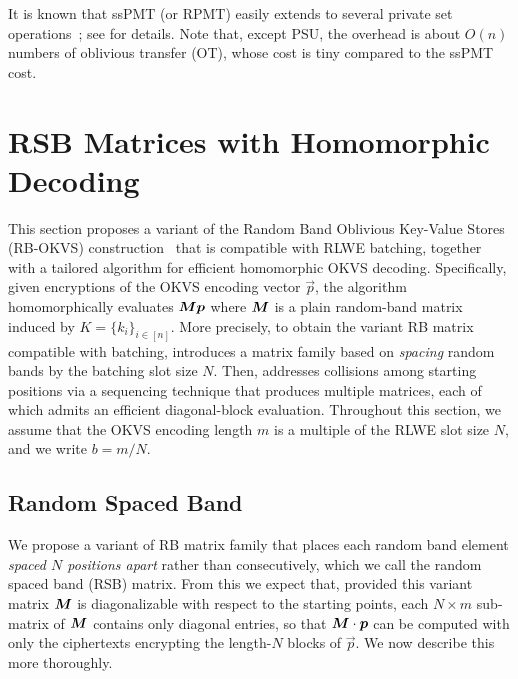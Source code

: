 It is known that ssPMT (or RPMT) easily extends to several private set operations~\cite{PSTY19,CGS22,CZZ+24}; see  for details. Note that, except PSU, the overhead is about $O(n)$ numbers of oblivious transfer (OT), whose cost is tiny compared to the ssPMT cost. 


\section{RSB Matrices with Homomorphic Decoding}\label{sec:rlwe-okvs}
This section proposes a variant of the Random Band Oblivious Key-Value Stores (RB-OKVS) construction~\cite{BPSY23} that is compatible with RLWE batching, together with a tailored algorithm for efficient homomorphic OKVS decoding. 
Specifically, given encryptions of the OKVS encoding vector $\vec p$, the algorithm homomorphically evaluates $\bm{M}\bm{p}$ where $\bm{M}$ is a plain random-band matrix induced by $K=\{k_i\}_{i\in[n]}$.
More precisely, to obtain the variant RB matrix compatible with batching,  introduces a matrix family based on \emph{spacing} random bands by the batching slot size $N$. 
Then,  addresses collisions among starting positions via a sequencing technique that produces multiple matrices, each of which admits an efficient diagonal-block evaluation.
Throughout this section, we assume that the OKVS encoding length $m$ is a multiple of the RLWE slot size $N$, and we write $b = m/N$.

\subsection{Random Spaced Band}\label{subsec:RSB OKVS}
We propose a variant of RB matrix family that places each random band element {\em spaced $N$ positions apart} rather than consecutively, which we call the random spaced band (RSB) matrix. From this we expect that, provided this variant matrix $\bm{M}$ is diagonalizable with respect to the starting points, each $N\times m$ sub-matrix of $\bm{M}$ contains only diagonal entries, so that $\bm{M}\cdot \bm{p}$ can be computed with only the ciphertexts encrypting the length-$N$ blocks of $\vec p$. We now describe this more thoroughly.


